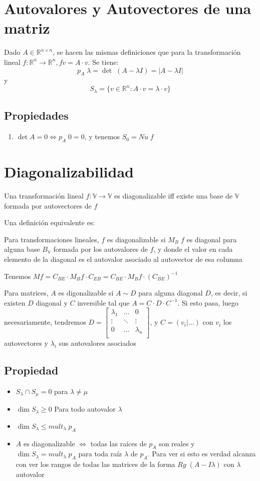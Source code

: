 \documentclass{article}
\def\R{\mathbb{R}}
\def\V{\mathbb{V}}
\begin{document}
\section{Autovalores y Autovectores de una matriz}
Dado $A \in \R^{n \times n}$, se hacen las mismas definiciones que para la
transformación lineal $f : \R^n \to \R^n, fv = A\cdot v$. Se tiene: \[
	p_A \; \lambda = \det \; (A - \lambda I) = |A - \lambda I|
	\] y \[
	S_\lambda = \{v \in \R^n : A\cdot v = \lambda \cdot v\}
\]

\subsection{Propiedades}
\begin{enumerate}
	\item $\det A = 0 \iff p_A \; 0 = 0$, y tenemos $S_0 = Nu \; f$
\end{enumerate}

\section{Diagonalizabilidad}
Una transformación lineal $f : \V \to \V$ es diagonalizable iff
existe una base de $\V$ formada por autovectores de $f$

Una definición equivalente es:

Para transformaciones lineales, $f$ es diagonalizable si $M_B \;f $ es
diagonal para alguna base $B_\V$ formada por los autovalores de $f$,
y donde el valor en cada elemento de la diagonal es el autovalor asociado al
autovector de esa columna

Tenemos $Mf = C_{BE} \cdot M_B f \cdot C_{EB} = C_{BE} \cdot M_B f \cdot
(C_{BE})^{-1}$

Para matrices, $A$ es digonalizable si $A \sim D$ para alguna diagonal $D$,
es decir, si existen $D$ diagonal y $C$ inversible
tal que $A = C\cdot D \cdot C^{-1}$.
Si esto pasa, luego necesariamente, tendremos
\(
D = \begin{bmatrix}
	\lambda_1 & \dots & 0 \\
	\vdots & \ddots & \vdots \\
	0 & \dots & \lambda_n \\
\end{bmatrix}
\), y \(
C = (v_i | \dots)
\) con $v_i$ los autovectores y $\lambda_i$ sus autovalores asociados
\subsection{Propiedad}
\begin{itemize}
	\item $S_\lambda \cap S_\mu = 0$ para $\lambda \neq \mu$
	\item $\dim S_\lambda \geq 0$ Para todo autovalor $\lambda$
	\item $\dim S_\lambda \leq mult_\lambda \; p_A$
	\item $A$ es diagonalizable $\iff$ todas las raíces de $p_A$ son reales
		y $\dim S_\lambda = mult_\lambda \; p_A$ para toda raíz $\lambda$ de
		$p_A$. Para ver si esto es verdad alcanza con ver los rangos de
		todas las matrices de la forma $Rg \;(A - I\lambda)$ con $\lambda$
		autovalor
\end{itemize}
\end{document}
